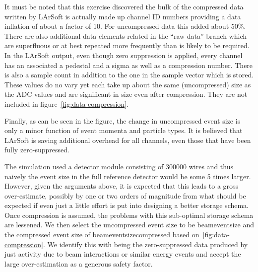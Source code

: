 


It must be noted that this exercise discovered the bulk of the
compressed data written by LArSoft is actually made up channel ID
numbers providing a data inflation of about a factor of 10.
For uncompressed data this added about 50\%.
There are also additional data elements related in the ``raw data''
branch which are superfluous or at best repeated more frequently than
is likely to be required.
In the LArSoft output, even though zero suppression is applied, every
channel has an associated a pedestal and a sigma as well as a
compression number.
There is also a sample count in addition to the one in the sample
vector which is stored.
These values do no vary yet each take up about the same (uncompressed)
size as the ADC values and are significant in size even after
compression.
They are not included in figure~\ref{fig:data-compression}.

Finally, as can be seen in the figure, the change in uncompressed
event size is only a minor function of event momenta and particle types.
It is believed that LArSoft is saving additional overhead for all
channels, even those that have been fully zero-suppressed.

The simulation used a detector module consisting of 300000 wires and
thus naively the event size in the full reference detector would be some 5 times
larger.
However, given the arguments above, it is expected that this leads to
a gross over-estimate, possibly by one or two orders of magnitude from
what should be expected if even just a little effort is put into
designing a better storage schema.
Once compression is assumed, the problems with this sub-optimal
storage schema are lessened.
We then select the uncompressed event size to be beameventsize and
the compressed event size of beameventsizecompressed based
on~\ref{fig:data-compression}.
We identify this with being the zero-suppressed data produced by just
activity due to beam interactions or similar energy events and accept
the large over-estimation as a generous safety factor.






